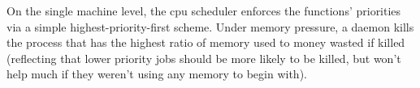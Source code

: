  
On the single machine level, the cpu scheduler enforces the functions’
priorities via a simple highest-priority-first scheme. Under memory pressure, a
daemon kills the process that has the highest ratio of memory used to money
wasted if killed (reflecting that lower priority jobs should be more likely to
be killed, but won’t help much if they weren’t using any memory to begin with).
